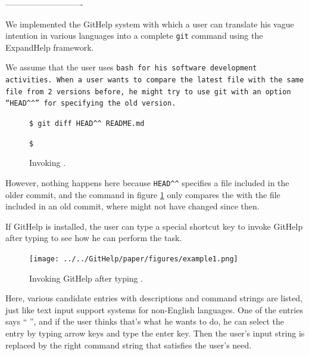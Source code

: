 \documentclass[manuscript,screen,review]{acmart}
\def\GH{\textsf{GitHelp}}
\def\GIT{\texttt{git}}
\def\EH{\textsf{ExpandHelp}}
\begin{document}
----------------------------

We implemented the {\GH} system
with which a user can translate his vague intention in various languages
into a complete {\GIT} command
using the {\EH} framework.


We assume that the user uses \tt{bash} for his software
development activities.
% 
When a user wants to compare the latest  file
with the same file from 2 versions before,
he might try to use {\GIT} with an option
``{\smallfont\verb|HEAD^^|}''
for specifying the old version.

\begin{figure}[h]
  {\smallfont
  \verb|$ git diff HEAD^^ README.md|
  \par
  \verb|$|
  }
  \caption{Invoking .}
  \label{gitdiff}
\end{figure}


However, nothing happens here because
\verb|HEAD^^|
specifies a file included in the older commit,
and the command in figure \ref{gitdiff} only compares the
 with the file included in an old commit, where
 might not have changed since then.

If {\GH} is installed,
the user can type a special shortcut key
to invoke {\GH} after typing  to see how he can
perform the task.

\begin{figure}[h]
  \texttt{[image: ../../GitHelp/paper/figures/example1.png]}
  \caption{Invoking {\GH} after typing .}
  \label{example1}
\end{figure}

Here, various candidate entries with
descriptions and command strings are listed,
just like text input support systems for non-English languages.
One of the entries says
``  '',
and if the user thinks that's what he wants to do,
he can select the entry by typing arrow keys and type the enter key.
Then the user's input string is replaced by the right command string
that satisfies the user's need.
\end{document}
